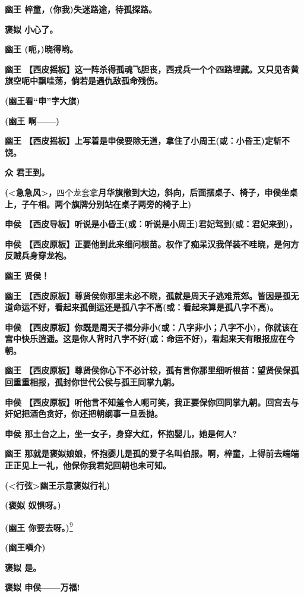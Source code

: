 \textbf{幽王 梓童，(你我)失迷路途，待孤探路。}

\textbf{褒姒 小心了。}

\textbf{幽王 (呃，)晓得哟。}

\textbf{幽王
【西皮摇板】这一阵杀得孤魂飞胆丧，西戎兵一个个四路埋藏。又只见杏黄旗空呃中飘哇荡，倘若是遇仇敌孤命残伤。}

\textbf{(幽王看``申''字大旗)}

\textbf{(幽王 啊------)}

\textbf{幽王
【西皮摇板】上写着是申侯要除无道，拿住了小周王(或：小昏王)定斩不饶。}

\textbf{众 君王到。}

\textbf{(\textless{}急急风\textgreater{}，}四个龙套拿\textbf{月华旗撤到大边，斜向，后面摆桌子、椅子，申侯坐桌上，子午相。两个旗牌分别站在桌子两旁的椅子上)}

\textbf{申侯
【西皮导板】听说是小昏王(或：听说是小周王)君妃驾到(或：君妃来到)，}

\textbf{申侯
【西皮原板】正要他到此来细问根苗。权作了痴呆汉我佯装不哇晓，是何方反贼兵身穿龙袍。}

\textbf{幽王 贤侯！}

\textbf{幽王
【西皮原板】尊贤侯你那里未必不晓，孤就是周天子逃难荒郊。皆因是孤无道命运不好，看起来孤倒运还是孤八字不高(或：看起来算是孤八字不高)。}

\textbf{申侯
【西皮原板】你既是周天子福分非小(或：八字非小；八字不小)，你就该在宫中快乐逍遥。这是你人背时八字不好(或：命运不好)，看起来天有眼报应在今朝。}

\textbf{幽王
【西皮原板】尊贤侯你心下不必计较，孤有言你那里细听根苗：望贤侯保孤回重重相报，孤封你世代公侯与孤王同掌九朝。}

\textbf{申侯
【西皮原板】听他言不知羞令人呃可笑，我正要保你回同掌九朝。回宫去与奸妃把酒色贪好，你还把朝纲事一旦丢抛。}

\textbf{申侯 那土台之上，坐一女子，身穿大红，怀抱婴儿，她是何人?}

\textbf{幽王
那就是褒姒娘娘，怀抱婴儿是孤的爱子名叫伯服。啊，梓童，上得前去端端正正见上一礼，他保你我君妃回朝也未可知。}

\textbf{(\textless{}行弦\textgreater{}幽王示意褒姒行礼)}

\textbf{(褒姒 奴惧呀。)}

\textbf{(幽王 你要去呀。)}\protect\hyperlink{fn9}{\textsuperscript{9}}

\textbf{(幽王嗔介)}

\textbf{褒姒 是。}

\textbf{褒姒 申侯------万福!}

